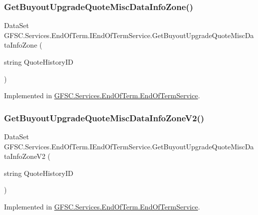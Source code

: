 \subsubsection{\texorpdfstring{Get\+Buyout\+Upgrade\+Quote\+Misc\+Data\+Info\+Zone()}{GetBuyoutUpgradeQuoteMiscDataInfoZone()}}
{\footnotesize\ttfamily Data\+Set G\+F\+S\+C.\+Services.\+End\+Of\+Term.\+I\+End\+Of\+Term\+Service.\+Get\+Buyout\+Upgrade\+Quote\+Misc\+Data\+Info\+Zone (\begin{DoxyParamCaption}\item[{string}]{Quote\+History\+ID }\end{DoxyParamCaption})}



Implemented in \mbox{\hyperlink{class_g_f_s_c_1_1_services_1_1_end_of_term_1_1_end_of_term_service_af019d207cbd168f64321133b1c27abcb}{G\+F\+S\+C.\+Services.\+End\+Of\+Term.\+End\+Of\+Term\+Service}}.

\mbox{\label{interface_g_f_s_c_1_1_services_1_1_end_of_term_1_1_i_end_of_term_service_a5453f7743fc39bc117dc375bcf06d7da}} 
\subsubsection{\texorpdfstring{Get\+Buyout\+Upgrade\+Quote\+Misc\+Data\+Info\+Zone\+V2()}{GetBuyoutUpgradeQuoteMiscDataInfoZoneV2()}}
{\footnotesize\ttfamily Data\+Set G\+F\+S\+C.\+Services.\+End\+Of\+Term.\+I\+End\+Of\+Term\+Service.\+Get\+Buyout\+Upgrade\+Quote\+Misc\+Data\+Info\+Zone\+V2 (\begin{DoxyParamCaption}\item[{string}]{Quote\+History\+ID }\end{DoxyParamCaption})}



Implemented in \mbox{\hyperlink{class_g_f_s_c_1_1_services_1_1_end_of_term_1_1_end_of_term_service_ae1b4b3ff075bbde23ef2eb71cf476c0b}{G\+F\+S\+C.\+Services.\+End\+Of\+Term.\+End\+Of\+Term\+Service}}.

